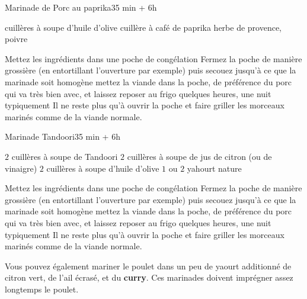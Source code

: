 \begin{recette}{Marinade de Porc au paprika}{3}{5 min + 6h}{}
\begin{ingredients}
 cuillères à soupe d'huile d'olive
 cuillère à café de paprika
\ingredient herbe de provence, poivre
\end{ingredients}

\begin{preparation}
\etape Mettez les ingrédients dans une poche de congélation
\etape Fermez la poche de manière grossière (en entortillant l'ouverture par exemple) puis secouez jusqu'à ce que la marinade soit homogène
\etape mettez la viande dans la poche, de préférence du porc qui va très bien avec, et laissez reposer au frigo quelques heures, une nuit typiquement
\etape Il ne reste plus qu'à ouvrir la poche et faire griller les morceaux marinés comme de la viande normale.
\end{preparation}

\end{recette}

\begin{recette}{Marinade Tandoori}{3}{5 min + 6h}{}
\begin{ingredients}
\ingredient $2$ cuillères à soupe de Tandoori
\ingredient $2$ cuillères à soupe de jus de citron (ou de vinaigre)
\ingredient $2$ cuillères à soupe d'huile d'olive
\ingredient $1$ ou $2$ yahourt nature
\end{ingredients}

\begin{preparation}
\etape Mettez les ingrédients dans une poche de congélation
\etape Fermez la poche de manière grossière (en entortillant l'ouverture par exemple) puis secouez jusqu'à ce que la marinade soit homogène
\etape mettez la viande dans la poche, de préférence du porc qui va très bien avec, et laissez reposer au frigo quelques heures, une nuit typiquement
\etape Il ne reste plus qu'à ouvrir la poche et faire griller les morceaux marinés comme de la viande normale.
\end{preparation}

\begin{remarque}
Vous pouvez également mariner le poulet dans un peu de yaourt additionné de citron vert, de l'ail écrasé, et du \textbf{curry}. Ces marinades doivent imprégner assez longtemps le poulet.
\end{remarque}

\end{recette}

